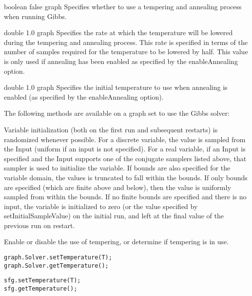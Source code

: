 
{boolean}
{false}
{graph}
{Specifies whether to use a tempering and annealing process when running Gibbs.}


{double}
{1.0}
{graph}
{Specifies the rate at which the temperature will be lowered during the tempering and annealing process. This rate is specified in terms of the number of samples required for the temperature to be lowered by half. This value is only used if annealing has been enabled as specified by the enableAnnealing option.}


{double}
{1.0}
{graph}
{Specifies the initial temperature to use when annealing is enabled (as specified by the enableAnnealing option).}



The following methods are available on a graph set to use the Gibbs solver:

Variable initialization (both on the first run and subsequent restarts) is randomized whenever possible.  For a discrete variable, the value is sampled from the Input (uniform if an input is not specified).  For a real variable, if an Input is specified and the Input supports one of the conjugate samplers listed above, that sampler is used to initialize the variable.  If bounds are also specified for the variable domain, the values is truncated to fall within the bounds.  If only bounds are specified (which are finite above and below), then the value is uniformly sampled from within the bounds.  If no finite bounds are specified and there is no input, the variable is initialized to zero (or the value specified by setInitialSampleValue) on the initial run, and left at the final value of the previous run on restart.

Enable or disable the use of tempering, or determine if tempering is in use.

\ifmatlab
\begin{lstlisting}
graph.Solver.setTemperature(T);
graph.Solver.getTemperature();
\end{lstlisting}
\fi

\ifjava
\begin{lstlisting}
sfg.setTemperature(T);
sfg.getTemperature();
\end{lstlisting}
\fi

